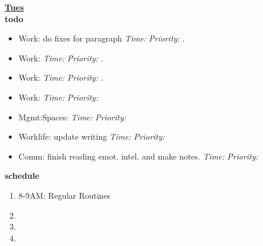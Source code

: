 \documentclass[serif, mathserif, final]{beamer}
\newcommand{\timeEst}[1]{\textit{Time:} \textit{#1}}
\newcommand{\priority}[1]{\textit{Priority:} \textit{#1}}
\newcommand{\deadline}[1]{#1}
\begin{document}
{            \textbf{\small \underline{Tues}} \\
            \textbf{\small todo} \\
            \begin{itemize}
              \tiny \item \tiny Work:  do fixes for paragraph                             \deadline{} \timeEst{} \priority{}. 
            \item \tiny Work:                                              \deadline{ }   \timeEst{}  \priority{}.
            \item \tiny Work:                                              \deadline{ }   \timeEst{}  \priority{}. 
            \item \tiny Work:                                              \deadline{} \timeEst{} \priority{} 
            \item \tiny Mgmt:Spaces:                                       \deadline{} \timeEst{} \priority{} 
            \item \tiny Worklife:   update writing                         \deadline{} \timeEst{} \priority{} 
            \item \tiny Comm:  finish reading emot. intel. and make notes.  \deadline{} \timeEst{} \priority{} 
            \end{itemize} 
            \textbf{\small schedule} \\
            \begin{enumerate}
              \tiny \item \tiny 8-9AM: Regular Routines 
            \item \tiny 
            \item \tiny 
            \item \tiny   
            \end{enumerate} 

}
\end{document}
